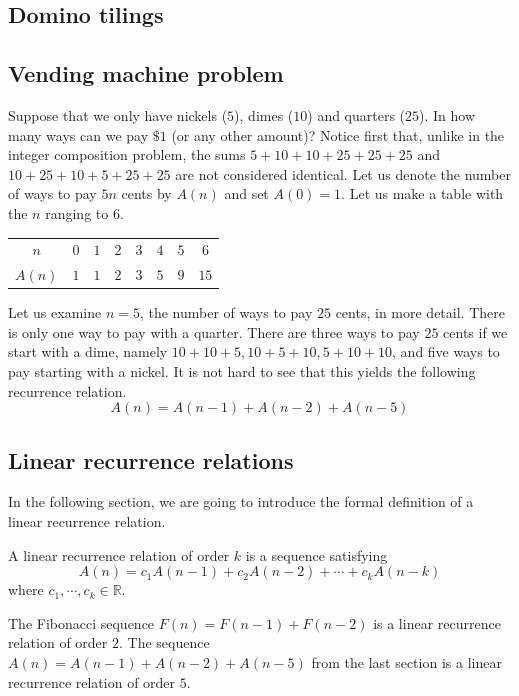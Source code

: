 \subsection{Domino tilings}

\subsection{Vending machine problem}

Suppose that we only have nickels ($5$), dimes ($10$) and quarters ($25$). In how many ways can we pay $\$1$ (or any other amount)?
Notice first that, unlike in the integer composition problem, the sums $5 + 10 + 10 + 25 + 25 + 25$ and $10 + 25 + 10 + 5 + 25 + 25$ are not considered identical.
Let us denote the number of ways to pay $5n$ cents by $A(n)$ and set $A(0)=1$. Let us make a table with the $n$ ranging to $6$.
\bigskip
\begin{center}
    \begin{tabular}{ |c|c|c|c|c|c|c|c| } 
     \hline
     $n$ & $0$ & $1$ & $2$ & $3$ & $4$ & $5$ & $6$ \\ 
     $A(n)$ & $1$ & $1$ & $2$ & $3$ & $5$ & $9$ & $15$ \\  
     \hline
    \end{tabular}
\end{center}
\bigskip
\noindent
Let us examine $n=5$, the number of ways to pay $25$ cents, in more detail. There is only one way to pay with a quarter. There are three ways 
to pay $25$ cents if we start with a dime, namely $10 + 10 + 5, 10 + 5 + 10, 5 + 10 + 10$, and five ways to pay starting with a nickel.
It is not hard to see that this yields the following recurrence relation.
$$
A(n) = A(n-1)+A(n-2)+A(n-5)
$$

\subsection{Linear recurrence relations}

In the following section, we are going to introduce the formal definition of a linear recurrence relation.

\begin{defn}
A linear recurrence relation of order $k$ is a sequence satisfying 
$$
A(n)=c_1A(n-1)+c_2A(n-2)+\cdots+c_kA(n-k)
$$
where $c_1,\cdots, c_k \in \mathbb{R}$.
\label{defn:rec}
\end{defn}

\begin{exmp}
The Fibonacci sequence $F(n)=F(n-1)+F(n-2)$ is a linear recurrence relation of order $2$. The sequence
$A(n)=A(n-1)+A(n-2)+A(n-5)$ from the last section is a linear recurrence relation of order $5$.
\end{exmp}

